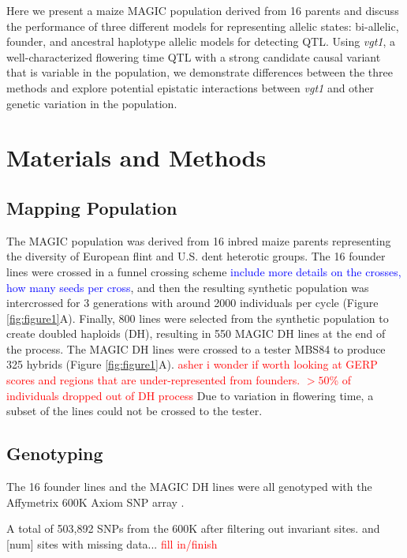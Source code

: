 \documentclass[article,9pt,twocolumn,twoside]{rilabRxiv}
\newcommand{\jri}[1]{{\small \textcolor{red}{#1}}}
\newcommand{\so}[1]{{\small \textcolor{blue}{#1}}}
\begin{document}
Here we present a maize MAGIC population derived from 16 parents and discuss the performance of three different models for representing allelic states: bi-allelic, founder, and ancestral haplotype allelic models for detecting QTL. %
Using \emph{vgt1}, a well-characterized flowering time QTL with a strong candidate causal variant that is variable in the population, we demonstrate differences between the three methods and explore potential epistatic interactions between \emph{vgt1} and other genetic variation in the population.

\section{Materials and Methods}
\label{sec:materials:methods}
\subsection{Mapping Population}
The MAGIC population was derived from 16 inbred maize parents representing the diversity of European flint and U.S. dent heterotic groups.
The 16 founder lines were crossed in a funnel crossing scheme \so{include more details on the crosses, how many seeds per cross}, and then the resulting synthetic population was intercrossed for 3 generations with around 2000 individuals per cycle (Figure \ref{fig:figure1}A).
Finally, 800 lines were selected from the synthetic population to create doubled haploids (DH), resulting in 550 MAGIC DH lines at the end of the process.
The MAGIC DH lines were crossed to a tester MBS84 to produce 325 hybrids (Figure \ref{fig:figure1}A). \jri{asher i wonder if worth looking at GERP scores and regions that are  under-represented from founders. $>50$\% of individuals dropped  out of DH process}
Due to variation in flowering time, a subset of the lines could not be crossed to the tester.
\subsection{Genotyping}

The 16 founder lines and the MAGIC DH lines were all genotyped with the Affymetrix 600K Axiom SNP array \citep{Unterseer}.

A total of 503,892 SNPs from the  600K after filtering out invariant sites.
and [num] sites with missing data... \jri{fill in/finish}
\end{document}
